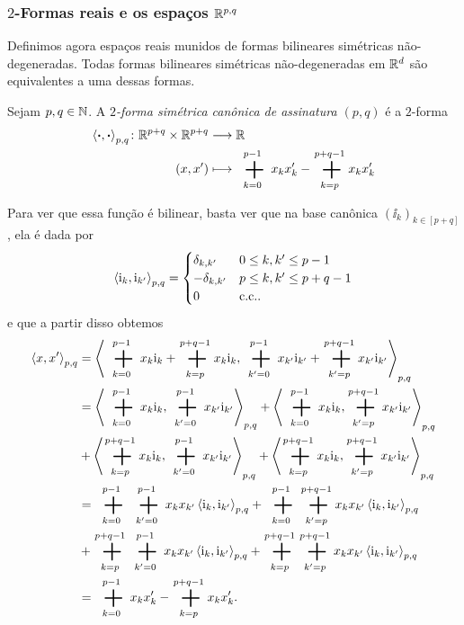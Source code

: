 \subsubsection{\ensuremath{2}-Formas reais e os espaços \ensuremath{\R^{p,q}}}

Definimos agora espaços reais munidos de formas bilineares simétricas não-degeneradas. Todas formas bilineares simétricas não-degeneradas em $\mathbb{R}^d$ são equivalentes a uma dessas formas.

\begin{definition}
Sejam $p,q \in \mathbb{N}$. A \emph{$2$-forma simétrica canônica de assinatura $(p,q)$} é a $2$-forma
	\begin{align*}
	\func{\inte{\var}{\var}_{p,q}}{\R^{p+q} \times \R^{p+q}}{\R}{(x,x')}{\sum_{k=0}^{p-1} x_k x'_k - \sum_{k=p}^{p+q-1} x_k x'_k}
	\end{align*}
\end{definition}

Para ver que essa função é bilinear, basta ver que na base canônica $(\ii_k)_{k \in [p+q]}$, ela é dada por
	\begin{equation*}
	\left\langle{\mathrm{i}_k},{\mathrm{i}_{k'}}\right\rangle_{p,q} =
		\begin{cases}
		\delta_{k,k'}	& 0 \leq k,k' \leq p-1 \\
		-\delta_{k,k'}	& p \leq k,k' \leq p+q-1 \\
		0				& \text{c.c.}.
		\end{cases}
	\end{equation*}
e que a partir disso obtemos
	\begin{align*}
	\inte{x}{x'}_{p,q} &= \inte{\sum_{k=0}^{p-1} x_k\ii_k + \sum_{k=p}^{p+q-1} x_k\ii_k}{\sum_{k'=0}^{p-1} x_{k'}\ii_{k'} + \sum_{k'=p}^{p+q-1} x_{k'}\ii_{k'}}_{p,q} \\
		&= \inte{\sum_{k=0}^{p-1} x_k\ii_k}{\sum_{k'=0}^{p-1} x_{k'}\ii_{k'}}_{p,q} + \inte{\sum_{k=0}^{p-1} x_k\ii_k}{\sum_{k'=p}^{p+q-1} x_{k'}\ii_{k'}}_{p,q} \\
		&+ \inte{\sum_{k=p}^{p+q-1} x_k\ii_k}{\sum_{k'=0}^{p-1} x_{k'}\ii_{k'}}_{p,q} + \inte{\sum_{k=p}^{p+q-1} x_k\ii_k}{\sum_{k'=p}^{p+q-1} x_{k'}\ii_{k'}}_{p,q} \\
		&= \sum_{k=0}^{p-1} \sum_{k'=0}^{p-1} x_kx_{k'}\inte{\ii_k}{\ii_{k'}}_{p,q} + \sum_{k=0}^{p-1} \sum_{k'=p}^{p+q-1} x_k x_{k'} \inte{\ii_k}{\ii_{k'}}_{p,q} \\
		&+ \sum_{k=p}^{p+q-1} \sum_{k'=0}^{p-1} x_k x_{k'} \inte{\ii_k}{\ii_{k'}}_{p,q} + \sum_{k=p}^{p+q-1} \sum_{k'=p}^{p+q-1} x_k x_{k'} \inte{\ii_k}{\ii_{k'}}_{p,q} \\
		&= \sum_{k=0}^{p-1} x_k x'_k - \sum_{k=p}^{p+q-1} x_k x'_k.
	\end{align*}

